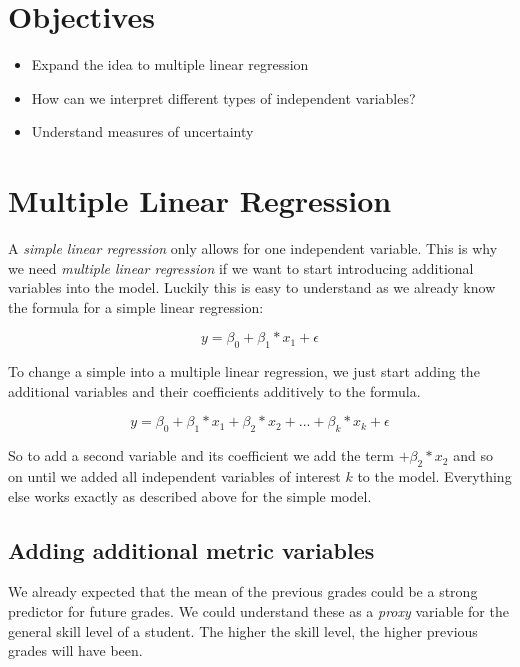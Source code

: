 \documentclass[
]{book}
\providecommand{\tightlist}{%
  \setlength{\itemsep}{0pt}\setlength{\parskip}{0pt}}
\begin{document}
\hypertarget{objectives-4}{%
\section{Objectives}\label{objectives-4}}

\begin{itemize}
\tightlist
\item
  Expand the idea to multiple linear regression
\item
  How can we interpret different types of independent variables?
\item
  Understand measures of uncertainty
\end{itemize}

\hypertarget{multiple-linear-regression}{%
\section{Multiple Linear Regression}\label{multiple-linear-regression}}

A \emph{simple linear regression} only allows for one independent variable. This is
why we need \emph{multiple linear regression} if we want to start introducing
additional variables into the model. Luckily this is easy to understand as we
already know the formula for a simple linear regression:

\[y = \beta_0 + \beta_1*x_1 + \epsilon\]

To change a simple into a multiple linear regression, we just start adding the
additional variables and their coefficients additively to the formula.

\[y = \beta_0 + \beta_1*x_1 + \beta_2*x_2 + ... + \beta_k*x_k + \epsilon\]

So to add a second variable and its coefficient we add the term \(+ \beta_2*x_2\)
and so on until we added all independent variables of interest \(k\) to the model.
Everything else works exactly as described above for the simple model.

\hypertarget{adding-additional-metric-variables}{%
\subsection{Adding additional metric variables}\label{adding-additional-metric-variables}}

We already expected that the mean of the previous grades could be a strong
predictor for future grades. We could understand these as a \emph{proxy} variable for
the general skill level of a student. The higher the skill level, the higher
previous grades will have been.
\end{document}
